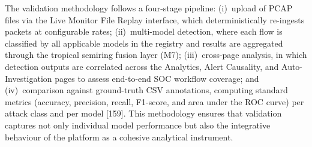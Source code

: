\documentclass[12pt,a4paper]{article}
\begin{document}
The validation methodology follows a four-stage pipeline: (i)~upload
of PCAP files via the Live Monitor File Replay interface, which
deterministically re-ingests packets at configurable rates;
(ii)~multi-model detection, where each flow is classified by all
applicable models in the registry and results are aggregated through
the tropical semiring fusion layer (M7); (iii)~cross-page analysis,
in which detection outputs are correlated across the Analytics,
Alert Causality, and Auto-Investigation pages to assess end-to-end
SOC workflow coverage; and (iv)~comparison against ground-truth CSV
annotations, computing standard metrics (accuracy, precision, recall,
F1-score, and area under the ROC curve) per attack class and per
model [159].  This methodology ensures that validation captures not
only individual model performance but also the integrative behaviour
of the platform as a cohesive analytical instrument.

\end{document}

